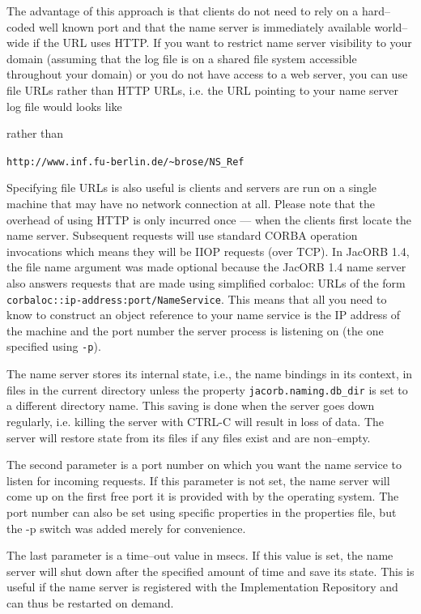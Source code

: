 The advantage of this approach is  that clients do not need to rely on
a hard--coded well known port  and that the name server is immediately
available world--wide  if the URL uses  HTTP. If you  want to restrict
name server visibility  to your domain (assuming that  the log file is
on a shared  file system accessible throughout your  domain) or you do
not have  access to a  web server, you  can use file URLs  rather than
HTTP URLs,  i.e. the URL pointing  to your name server  log file would
looks like


rather than

\noindent\verb+http://www.inf.fu-berlin.de/~brose/NS_Ref+

Specifying file URLs is also useful is clients and servers are run on
a single machine that may have no network connection at all. Please
note that the overhead of using HTTP is only incurred once --- when
the clients first locate the name server.  Subsequent requests will
use standard CORBA operation invocations which means they will be IIOP
requests (over TCP). In JacORB 1.4, the file name argument was made
optional because the JacORB 1.4 name server also answers requests that
are made using simplified corbaloc: URLs of the form {\tt
  corbaloc::ip-address:port/NameService}. This means that all you need
to know to construct an object reference to your name service is the
IP address of the machine and the port number  the server process is
listening on (the one specified using {\tt -p}).

The name server stores its  internal state, i.e., the name bindings in
its context,  in files  in the current  directory unless  the property
{\tt jacorb.naming.db\_dir} is set to a different directory name. This
saving is done  when the server goes down  regularly, i.e. killing the
server  with CTRL-C  will result  in loss  of data.   The  server will
restore state from its files if any files exist and are non--empty.

The second  parameter is a port number on which you want the name
service to listen for incoming requests. If this parameter is not
set, the name server will come up on the first free port it is
provided with by the operating system. The port number can also be set
using specific properties in the properties file, but the -p switch
was added merely for convenience.

The last  parameter is a time--out  value in msecs. If  this value is
set, the name server will shut down after the specified amount of time
and save  its state. This is  useful if the name  server is registered
with  the  Implementation Repository  and  can  thus  be restarted  on
demand.

